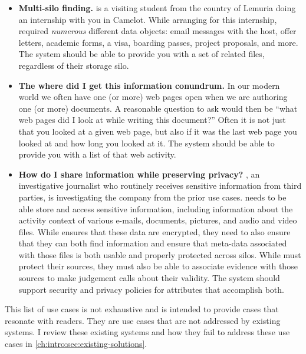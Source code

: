 \begin{itemize}
    \item \label{use-case:multi-silo-finding}\textbf{Multi-silo finding.} \persd is a visiting student from the
          country of Lemuria doing an internship with you in Camelot.  While arranging
          for this internship, \persd required \emph{numerous} different data objects:
          email messages with the host, offer letters, academic forms, a visa,
          boarding passes, project proposals, and more. The system should be able to
          provide you with a set of related files, regardless of their storage
          silo.

    \item \label{use-case:info-source}\textbf{The where did I get this information conundrum.}  In our modern
          world we often have one (or more) web pages open when we are authoring one
          (or more) documents.  A reasonable question to ask would then be ``what web
          pages did I look at while writing this document?'' Often it is not just that
          you looked at a given web page, but also if it was the last web page you
          looked at and how long you looked at it.  The system should be able to
          provide you with a list of that web activity.

    \item \label{use-case:privacy}\textbf{How do I share information while
              preserving privacy?} \persg, an investigative journalist who routinely receives
          sensitive information
          from third parties, is investigating the company from the prior use cases.
          \persg needs to be able store and access sensitive information, including
          information about the activity context of various e-mails, documents, pictures,
          and audio and video files. While \persg ensures that these data are
          encrypted, they need to also ensure
          that they can both find information and ensure that meta-data associated with
          those files is both usable and properly protected across silos.
          While \persg must protect their sources, they must also be able to associate
          evidence with those sources to make judgement calls about their validity.
          The system should support security and privacy policies for attributes that
          accomplish both.
\end{itemize}

This list of use cases is not exhaustive and is intended to provide cases that
resonate with readers.  They are use cases that are not addressed by existing
systems.  I review these existing systems and how they fail to address these use
cases in \autoref{ch:intro:sec:existing-solutions}.

